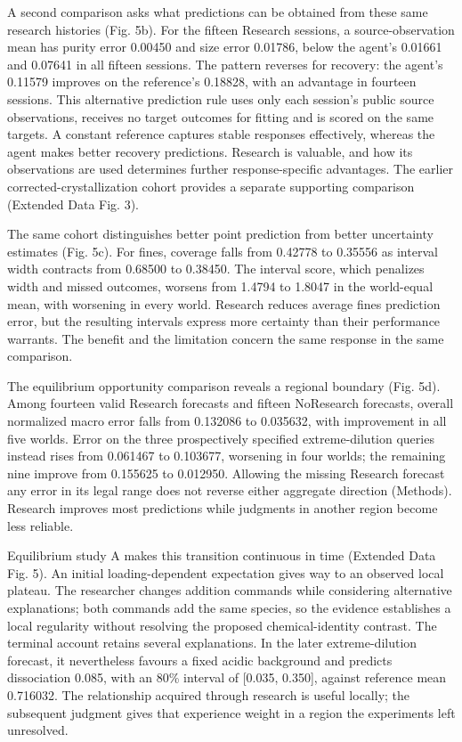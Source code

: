 \documentclass[12pt,a4paper]{article}
\begin{document}
A second comparison asks what predictions can be obtained from these same research histories (Fig. 5b). For the fifteen Research sessions, a source-observation mean has purity error 0.00450 and size error 0.01786, below the agent's 0.01661 and 0.07641 in all fifteen sessions. The pattern reverses for recovery: the agent's 0.11579 improves on the reference's 0.18828, with an advantage in fourteen sessions. This alternative prediction rule uses only each session's public source observations, receives no target outcomes for fitting and is scored on the same targets. A constant reference captures stable responses effectively, whereas the agent makes better recovery predictions. Research is valuable, and how its observations are used determines further response-specific advantages. The earlier corrected-crystallization cohort provides a separate supporting comparison (Extended Data Fig. 3).

The same cohort distinguishes better point prediction from better uncertainty estimates (Fig. 5c). For fines, coverage falls from 0.42778 to 0.35556 as interval width contracts from 0.68500 to 0.38450. The interval score, which penalizes width and missed outcomes, worsens from 1.4794 to 1.8047 in the world-equal mean, with worsening in every world. Research reduces average fines prediction error, but the resulting intervals express more certainty than their performance warrants. The benefit and the limitation concern the same response in the same comparison.

The equilibrium opportunity comparison reveals a regional boundary (Fig. 5d). Among fourteen valid Research forecasts and fifteen NoResearch forecasts, overall normalized macro error falls from 0.132086 to 0.035632, with improvement in all five worlds. Error on the three prospectively specified extreme-dilution queries instead rises from 0.061467 to 0.103677, worsening in four worlds; the remaining nine improve from 0.155625 to 0.012950. Allowing the missing Research forecast any error in its legal range does not reverse either aggregate direction (Methods). Research improves most predictions while judgments in another region become less reliable.

Equilibrium study A makes this transition continuous in time (Extended Data Fig. 5). An initial loading-dependent expectation gives way to an observed local plateau. The researcher changes addition commands while considering alternative explanations; both commands add the same species, so the evidence establishes a local regularity without resolving the proposed chemical-identity contrast. The terminal account retains several explanations. In the later extreme-dilution forecast, it nevertheless favours a fixed acidic background and predicts dissociation 0.085, with an 80\% interval of {[}0.035, 0.350{]}, against reference mean 0.716032. The relationship acquired through research is useful locally; the subsequent judgment gives that experience weight in a region the experiments left unresolved.
\end{document}

